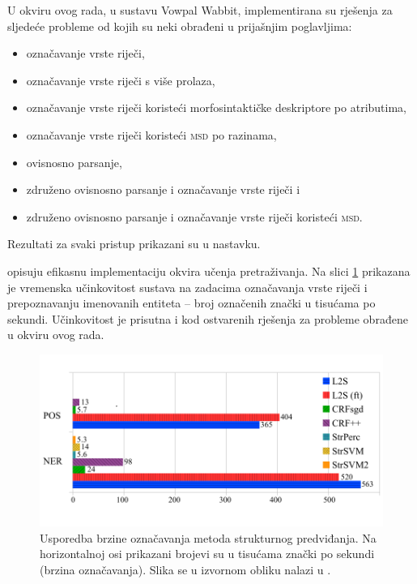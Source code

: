 U okviru ovog rada, u sustavu Vowpal Wabbit, implementirana su rješenja za
sljedeće probleme od kojih su neki obrađeni u prijašnjim poglavljima:
\begin{itemize}
  \item označavanje vrste riječi,
  \item označavanje vrste riječi s više prolaza,
  \item označavanje vrste riječi koristeći morfosintaktičke deskriptore
   po atributima,
  \item označavanje vrste riječi koristeći \textsc{msd} po
  razinama,
  \item ovisnosno parsanje,
  \item združeno ovisnosno parsanje i označavanje vrste riječi i
  \item združeno ovisnosno parsanje i označavanje vrste riječi koristeći
  \textsc{msd}.
\end{itemize}
Rezultati za svaki pristup prikazani su u nastavku.

\citet{daume14lts} opisuju efikasnu implementaciju okvira učenja pretraživanja.
Na slici \ref{fig:ltsperf} prikazana je vremenska učinkovitost sustava na
zadacima označavanja vrste riječi i prepoznavanju imenovanih entiteta -- broj označenih
znački u tisućama po sekundi. Učinkovitost je prisutna i kod ostvarenih rješenja
za probleme obrađene u okviru ovog rada.

\begin{figure}
  \centering
  \includegraphics[scale=0.9]{tokenposec.pdf}
  \caption[Usporedba brzine označavanja metoda strukturnog
  predviđanja.]{Usporedba brzine označavanja metoda strukturnog predviđanja. Na
  horizontalnoj osi prikazani brojevi su u tisućama znački po sekundi (brzina
  označavanja). Slika se u izvornom obliku nalazi u \citep{ltsicmltutorial}.}
  \label{fig:ltsperf}
\end{figure}
